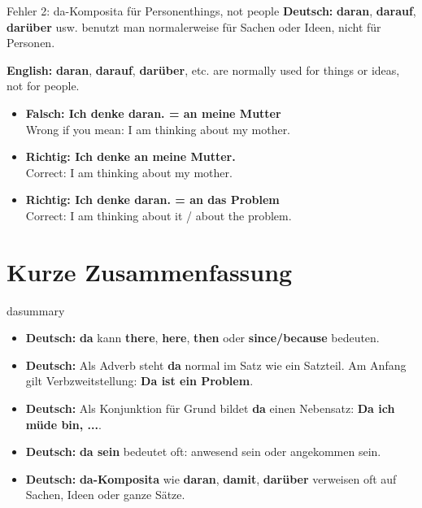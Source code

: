 \documentclass[a4paper,11pt]{article}
\newcommand{\GermanText}[1]{\textbf{Deutsch: }#1\par}
\newcommand{\EnglishText}[1]{{\small\color{SoftGray}\textbf{English: }#1\par}}
\newcommand{\ExampleItem}[2]{\item \textbf{#1}\\{\small\color{SoftGray}#2}}
\begin{document}
\begin{grammarentry}{Fehler 2: da-Komposita für Personen}{things, not people}
\GermanText{\textbf{daran}, \textbf{darauf}, \textbf{darüber} usw. benutzt man normalerweise für Sachen oder Ideen, nicht für Personen.}
\EnglishText{\textbf{daran}, \textbf{darauf}, \textbf{darüber}, etc. are normally used for things or ideas, not for people.}

\begin{exbox}
\begin{itemize}
    \ExampleItem{Falsch: Ich denke daran. = an meine Mutter}{Wrong if you mean: I am thinking about my mother.}
    \ExampleItem{Richtig: Ich denke an meine Mutter.}{Correct: I am thinking about my mother.}
    \ExampleItem{Richtig: Ich denke daran. = an das Problem}{Correct: I am thinking about it / about the problem.}
\end{itemize}
\end{exbox}
\end{grammarentry}

\section{Kurze Zusammenfassung}

\begin{grammarentry}{da}{summary}
\begin{itemize}
    \item \GermanText{\textbf{da} kann \textbf{there}, \textbf{here}, \textbf{then} oder \textbf{since/because} bedeuten.}
    \item \GermanText{Als Adverb steht \textbf{da} normal im Satz wie ein Satzteil. Am Anfang gilt Verbzweitstellung: \textbf{Da ist ein Problem}.}
    \item \GermanText{Als Konjunktion für Grund bildet \textbf{da} einen Nebensatz: \textbf{Da ich müde bin, ...}.}
    \item \GermanText{\textbf{da sein} bedeutet oft: anwesend sein oder angekommen sein.}
    \item \GermanText{\textbf{da-Komposita} wie \textbf{daran}, \textbf{damit}, \textbf{darüber} verweisen oft auf Sachen, Ideen oder ganze Sätze.}
\end{itemize}
\end{grammarentry}
\end{document}
